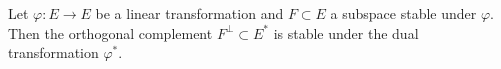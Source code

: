 Let $\varphi: E \to E$ be a linear transformation and $F \subset E$ a subspace stable under $\varphi$. Then the orthogonal complement $F^\perp \subset E^*$ is stable under the dual transformation $\varphi^*$.
